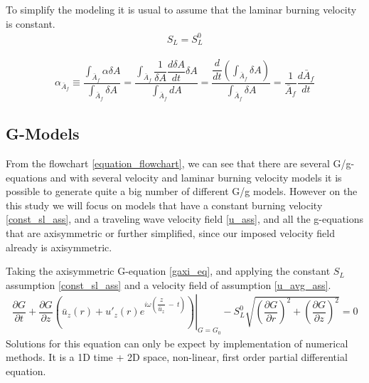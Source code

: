 \begin{assumption}
To simplify the modeling it is usual to assume that the laminar burning velocity is constant.
\begin{align}
	S_L=S_L^0
\end{align}
\label{const_sl_ass}
\end{assumption}


\begin{assumption}
\begin{align*}
	\alpha_{\bar{A}_f} \equiv \dfrac{\int_{\bar{A}_f} \alpha \delta A}{\int_{\bar{A}_f} \delta A}= \dfrac{\int_{\bar{A}_f} \dfrac{1}{\delta A}\dfrac{d \delta A}{d t}\delta A}{\int_{\bar{A}_f} dA}= \dfrac{\dfrac{d}{dt} \left( \int_{\bar{A}_f}\delta A \right)}{\int_{\bar{A}_f}\delta A}=\dfrac{1}{\bar{A}_f}\dfrac{d \bar{A}_f}{dt} 	
\end{align*}
\end{assumption}



\newpage
\subsection{G-Models}
From the flowchart \ref{equation_flowchart}, we can see that there are several G/g-equations and with several velocity and laminar burning velocity models it is possible to generate quite a big number of different G/g models. However on the this study we will focus on models that have a constant burning velocity \ref{const_sl_ass}, and a traveling wave velocity field \ref{u_ass}, and all the g-equations that are axisymmetric or further simplified, since our imposed velocity field already is axisymmetric.
\begin{theorem}
Taking the axisymmetric G-equation \eqref{gaxi_eq}, and applying the constant $S_L$ assumption \ref{const_sl_ass} and a velocity field of assumption \ref{u_avg_ass}.
\begin{align}
	\dfrac{\partial G}{\partial t} +  \dfrac{\partial G}{\partial z} \left. \left(\bar{u}_z(r) + u'_z(r)e^{i\omega\left(\dfrac{z}{\bar{u}_z}\ -\ t\right)} \right)\right|_{G=G_0} - S_L^0 \sqrt{ \left(\dfrac{\partial G}{\partial r}\right)^2 + \left(\dfrac{\partial G}{\partial z}\right)^2 }=0 
\end{align}
Solutions for this equation can only be expect by implementation of numerical methods. It is a 1D time + 2D space, non-linear, first order partial differential equation.
\end{theorem}

